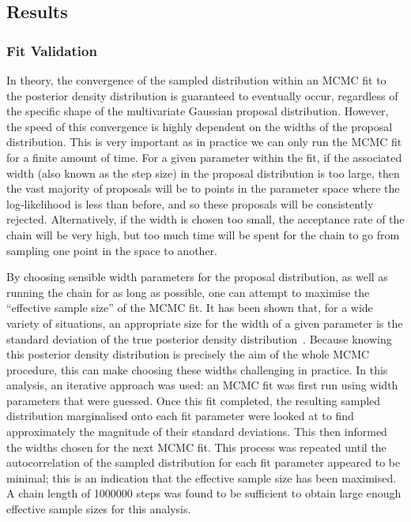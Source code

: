 \subsection{Results}
\subsubsection{Fit Validation}
In theory, the convergence of the sampled distribution within an MCMC fit to the posterior density distribution is guaranteed to eventually occur, regardless of the specific shape of the multivariate Gaussian proposal distribution. However, the speed of this convergence is highly dependent on the widths of the proposal distribution. This is very important as in practice we can only run the MCMC fit for a finite amount of time. For a given parameter within the fit, if the associated width (also known as the step size) in the proposal distribution is too large, then the vast majority of proposals will be to points in the parameter space where the log-likelihood is less than before, and so these proposals will be consistently rejected. Alternatively,  if the width is chosen too small, the acceptance rate of the chain will be very high, but too much time will be spent for the chain to go from sampling one point in the space to another.

By choosing sensible width parameters for the proposal distribution, as well as running the chain for as long as possible, one can attempt to maximise the ``effective sample size'' of the MCMC fit. It has been shown that, for a wide variety of situations, an appropriate size for the width of a given parameter is the standard deviation of the true posterior density distribution~\cite{gelmanChapter11Basics2013}. %
Because knowing this posterior density distribution is precisely the aim of the whole MCMC procedure, this can make choosing these widths challenging in practice. In this analysis, an iterative approach was used: an MCMC fit was first run using width parameters that were guessed. Once this fit completed, the resulting sampled distribution marginalised onto each fit parameter were looked at to find approximately the magnitude of their standard deviations. This then informed the widths chosen for the next MCMC fit. This process was repeated until the autocorrelation of the sampled distribution for each fit parameter appeared to be minimal; this is an indication that the effective sample size has been maximised. A chain length of \num{1000000} steps was found to be sufficient to obtain large enough effective sample sizes for this analysis.

